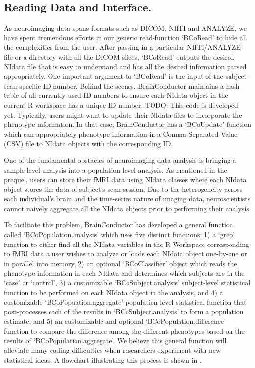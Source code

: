 \documentclass{nature}
\begin{document}
\subsection{Reading Data and Interface.}
As neuroimaging data spans formats such as DICOM, NIfTI and ANALYZE, we have 
spent tremendous efforts in our generic read-function `BCoRead' to hide
all the complexities from the user. After passing in a particular NIfTI/ANALYZE
file
or a directory with all the DICOM slices, `BCoRead' outputs the desired NIdata
file
that is easy to understand and has all the desired information parsed
appropriately.
One important argument to `BCoRead' is the input of the subject-scan specific ID
number. Behind the
scenes, BrainConductor maintains a hash table of all currently used ID numbers
to ensure
each NIdata object in the current R workspace has a unique ID number.
{\color{red}TODO: This code is developed yet.}
Typically, users might want to update their NIdata files to incorporate the
phenotype information. In that case, BrainConductor has a `BCoUpdate' function
which can appropriately phenotype information in a Comma-Separated Value (CSV)
file
to NIdata objects with the corresponding ID.

One of the fundamental obstacles of neuroimaging data analysis is bringing a
sample-level
analysis into a population-level analysis. As mentioned in the prequel, users
can
store their fMRI data using NIdata classes where each NIdata object stores the
data of
subject's scan session. Due to the heterogeneity across each individual's brain
and
the time-series nature of imaging data,
neuroscientists cannot naively aggregate all the NIdata objects prior to
performing their
analysis. 

To facilitate this problem, BrainConductor has developed a general function
called 
`BCoPopulation.analysis' which uses five distinct functions: 1) a `grep'
function to either
find all the NIdata variables in the R Workspace corresponding to fMRI data a
user wishes
to analyze or loads each NIdata object one-by-one or in parallel into memory, 
2) an optional `BCoClassifier' object which reads the phenotype information
in each NIdata and determines which subjects are in the `case' or `control', 3)
a customizable `BCoSubject.analysis' subject-level statistical function to be
performed on each NIdata object in the
analysis, and 4) a customizable `BCoPopuation.aggregate' population-level
statistical function
that post-processes each of the results in `BCoSubject.analysis' to form a
population
estimate, and 5) an customizable and optional `BCoPopulation.difference'
function
to compare the difference among the different phenotypes based on the 
results of `BCoPopulation.aggregate'. We believe this general
function will alleviate many coding difficulties when researchers experiment
with
new statistical ideas. A flowchart illustrating this process is shown in
.
\end{document}
